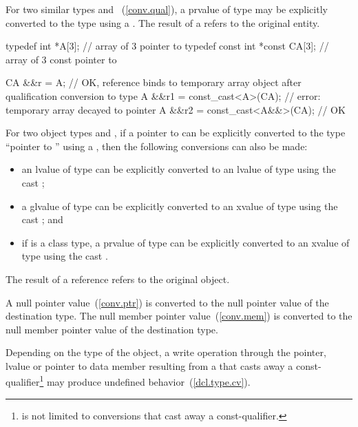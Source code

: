 \pnum
For two similar types  and ~(\ref{conv.qual}),
a prvalue of type  may be explicitly
converted to the type  using a . The result
of a  refers to the original entity.
\enterexample
\begin{codeblock}
typedef int *A[3];               // array of 3 pointer to 
typedef const int *const CA[3];  // array of 3 const pointer to 

CA &&r = A{}; // OK, reference binds to temporary array object after qualification conversion to type 
A &&r1 = const_cast<A>(CA{});   // error: temporary array decayed to pointer
A &&r2 = const_cast<A&&>(CA{}); // OK
\end{codeblock}
\exitexample

\pnum
For two object types  and , if a pointer to  can
be explicitly converted to the type ``pointer to '' using a
, then the following conversions can also be made:

\begin{itemize}
\item an lvalue of type  can be explicitly converted to an lvalue
of type  using the cast ;

\item a glvalue of type  can be explicitly converted to an xvalue
of type  using the cast ; and

\item if  is a class type, a prvalue of type  can be
explicitly converted to an xvalue of type  using the cast
.
\end{itemize}

The result of a reference  refers
to the original object.

\pnum
A null pointer value~(\ref{conv.ptr}) is converted to the null pointer
value of the destination type. The null member pointer
value~(\ref{conv.mem}) is converted to the null member pointer value of
the destination type.

\pnum
\enternote 
Depending on the type of the object, a write operation through the
pointer, lvalue or pointer to data member resulting from a
 that casts away a const-qualifier\footnote{
is not limited to conversions that cast away a
const-qualifier.}
may produce undefined behavior~(\ref{dcl.type.cv}).
\exitnote 


